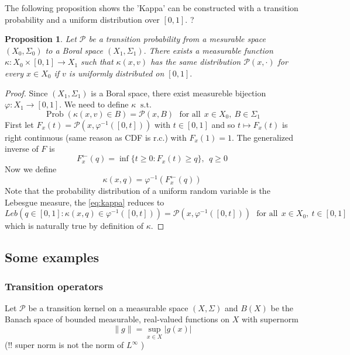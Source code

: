\documentclass[12pt, reqno]{amsart}
\renewcommand{\geq}{\geqslant}
\DeclareMathOperator{\Prob}{Prob}
\newcommand{\st}{\ensuremath{\ \mathrm{s.t.}\ }}
\newcommand{\setntn}[2]{ \{ #1 : #2 \} }
\newcommand{\1}{\mathbbm 1}
\newcommand{\pP}{\mathcal P}
\renewcommand{\phi}{\varphi}
\theoremstyle{plain}
\newtheorem{proposition}[theorem]{Proposition}
\theoremstyle{definition}
\begin{document}
 The following proposition shows the 'Kappa' can be constructed with a transition probability and a uniform distribution over $[0,1].$ ?
 
 \begin{proposition}
 	Let $\pP$ be a transition probability from a \emph{mesurable space} $(X_0,\Sigma_0)$ to a \emph{Boral space} $(X_1,\Sigma_1).$ There exists a measurable function $\kappa\colon X_0\times [0,1] \rightarrow X_1$ such that $\kappa(x,v)$ has the same distribution $\pP(x,\cdot)$ for every $x\in X_0$ if $v$ is uniformly distributed on $[0,1].$
 \end{proposition}
\begin{proof}
Since $(X_1,\Sigma_1)$ is a Boral space, there exist measureble bijection $\phi\colon X_1\rightarrow[0,1] .$ We need to define $\kappa$ $\st$ 
\begin{equation}\label{eq:kappa}
   \Prob(\kappa(x,v)\in B)=\pP(x,B)~~~\text{for all}~~x\in X_0,~ B\in \Sigma_1
\end{equation}
First let $F_x(t)=\pP(x,\phi^{-1}([0,t]))$ with $t\in [0,1]$ and so $t\mapsto F_x(t)$ is right continuous (same reason as CDF is r.c.) with $ F_x(1)=1.$ The generalized inverse of $F$ is
\begin{equation*}
   F^{\leftarrow}_x(q) =\inf\setntn{t\geq 0}{F_x(t)\geq q}, ~~q\geq0
\end{equation*}
Now we define 
\begin{equation*}
 \kappa(x,q)=\phi^{-1}(F^{\leftarrow}_x(q) )
\end{equation*}
Note that the probability distribution of a uniform random variable is the Lebesgue measure, the \eqref{eq:kappa} reduces to
\begin{equation}\label{eq:kappa2}
   Leb(q\in[0,1]: \kappa(x,q)\in \phi^{-1}([0,t]) )=\pP(x,\phi^{-1}([0,t]) )~~~\text{for all}~~x\in X_0,~ t\in [0,1]
\end{equation}
which is naturally true by definition of $\kappa$.
\end{proof}
\subsection{Some examples}
\subsubsection{Transition operators}
Let $\pP$ be a transition kernel on a measurable space $(X,\Sigma)$ and $B(X)$ be the Banach space of bounded measurable, real-valued functions on $X$ with supernorm
\begin{equation*}
	\|g\|=\sup_{x\in X}|g(x)|
\end{equation*}
\color{orange}(!! super norm is not the norm of $L^{\infty}$ )\color{black}
\end{document}
